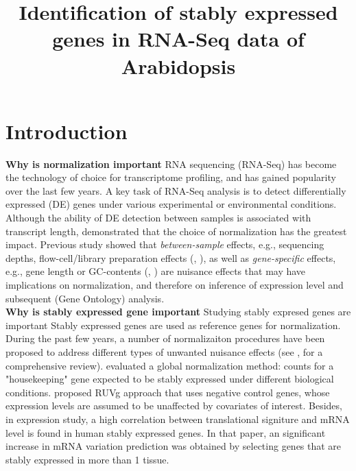 \documentclass[11pt, a4paper]{article}
\title{Identification of stably expressed genes in RNA-Seq data of  Arabidopsis}
\date{} %
\begin{document}
\maketitle


\section{Introduction}

\textbf{Why is normalization important}
RNA sequencing (RNA-Seq) has become the technology of choice for transcriptome profiling, and has gained popularity over the last few years. A key task of RNA-Seq analysis is to detect differentially expressed (DE) genes under various experimental or environmental conditions. Although the ability of DE detection between samples is associated with transcript length\citep{oshlack2009transcript}, \cite{bullard2010evaluation} demonstrated that the choice of normalization has the greatest impact. Previous study showed that \textit{between-sample} effects, e.g., sequencing depths, flow-cell/library preparation effects (\cite{bullard2010evaluation}, \cite{robinson2010scaling}), as well as \textit{gene-specific} effects, e.g.,  gene length or GC-contents (\cite{risso2011gc}, \cite{hansen2012removing}) are nuisance effects that may have implications on normalization, and therefore on inference of expression level and subsequent (Gene Ontology) analysis.  \\

\textbf{Why is stably expressed gene important}
Studying stably expresed genes are important Stably expressed genes are used as reference genes for normalization. During the past few years, a number of normalizaiton procedures have been proposed to address different types of unwanted nuisance effects (see \cite{dillies2013comprehensive}, \cite{risso2014nat} for a comprehensive review).\cite{bullard2010evaluation} evaluated a global normalization method: counts for a "housekeeping" gene expected to be stably expressed under different biological conditions. \cite{risso2014nat}  proposed RUVg approach that uses negative control genes, whose expression levels are assumed to be unaffected by covariates of interest. 
 Besides, in expression study, a high correlation between translational signiture and mRNA level is found in human stably expressed genes\citep{line2013translational}. In that paper, an significant increase in mRNA variation prediction was obtained by selecting genes that are stably expressed in more than 1 tissue.\\
\end{document}
